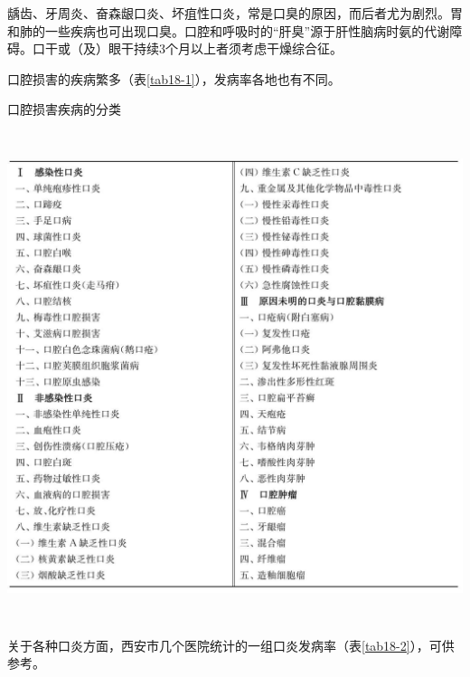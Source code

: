 龋齿、牙周炎、奋森龈口炎、坏疽性口炎，常是口臭的原因，而后者尤为剧烈。胃和肺的一些疾病也可出现口臭。口腔和呼吸时的“肝臭”源于肝性脑病时氨的代谢障碍。口干或（及）眼干持续3个月以上者须考虑干燥综合征。

口腔损害的疾病繁多（表\ref{tab18-1}），发病率各地也有不同。

\begin{table}[htbp]
\centering
\caption{口腔损害疾病的分类}
\label{tab18-1}
\includegraphics[width=5.91667in,height=5.625in]{./images/Image00113.jpg}
\end{table}

关于各种口炎方面，西安市几个医院统计的一组口炎发病率（表\ref{tab18-2}），可供参考。

